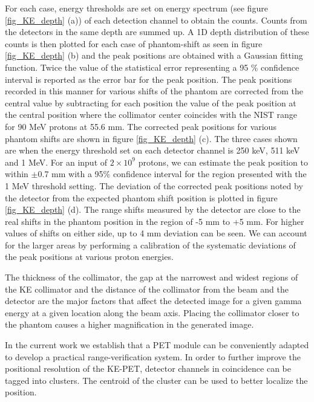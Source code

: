 \documentclass[11pt,a4paper]{article}
\begin{document}
For each case, energy thresholds are set on energy spectrum (see figure \ref{fig_KE_depth} (a)) of each detection channel to obtain the counts. Counts from the detectors in the same depth are summed up. A 1D depth distribution of these counts is then plotted for each case of phantom-shift as seen in figure \ref{fig_KE_depth} (b) and the peak positions are obtained with a Gaussian fitting function. Twice the value of the statistical error representing a 95 \% confidence interval is reported as the error bar for the peak position. The peak positions recorded in this manner for various shifts of the phantom are corrected from the central value by subtracting for each position the value of the peak position at the central position where the collimator center coincides with the NIST range for 90 MeV protons at 55.6 mm. The corrected peak positions for various phantom shifts are shown in figure \ref{fig_KE_depth} (c). The three cases shown are when the energy threshold set on each detector channel is 250 keV, 511 keV and 1  MeV. For an input of $\mathrm{2\times 10^9}$ protons,  we can estimate the peak position to within  $\pm$0.7 mm with a 95\% confidence interval for the  region presented with the 1 MeV threshold setting. The deviation of the corrected peak positions noted by the detector from the expected phantom shift position is plotted in figure \ref{fig_KE_depth} (d). The range shifts measured by the detector are close to the real shifts in the phantom position  in the region of -5 mm to +5 mm. For higher values of shifts on either side, up to 4 mm deviation can be seen. We can account for the larger areas by performing a calibration of the systematic deviations of the peak positions at various proton energies.



The thickness of the collimator, the gap at the narrowest and widest regions of the KE collimator and the distance of the collimator from the beam and the detector are the major factors that affect the detected image for a given gamma energy at a given location along the beam axis. Placing the collimator closer to the phantom causes a higher magnification in the generated image.

In the current work we establish that a PET module can be conveniently adapted to develop a practical range-verification system. In order to further improve the positional resolution of the KE-PET, detector channels in coincidence can be tagged into clusters. The centroid of the cluster can be used to better localize the position. 
\end{document}
